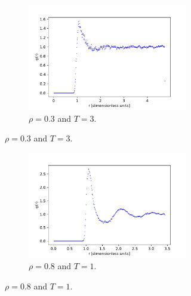 \documentclass[10 pt, a4paper]{article}
\begin{document}
\begin{figure}[H] 
\begin{subfigure}[b]{0.33\textwidth}
\begin{figure}[H]
\includegraphics[width=\textwidth]{pdfgas}
\caption{$\rho = 0.3$ and $T = 3$.}
\end{figure}
\end{subfigure}
\begin{subfigure}[b]{0.33\textwidth}
\begin{figure}[H] 
\includegraphics[width=\textwidth]{pdfliq}
\caption{$\rho = 0.8$ and $T = 1$.}
\end{figure}
\end{subfigure}
\begin{subfigure}[b]{0.33\textwidth}
\begin{figure}[H] 

\end{figure}
\end{subfigure}
\end{figure}
\end{document}
